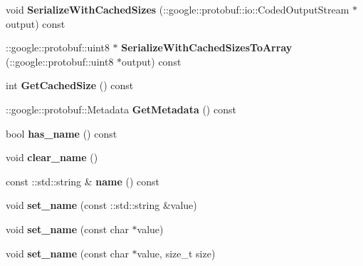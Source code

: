 \begin{DoxyCompactItemize}
void {\bfseries Serialize\+With\+Cached\+Sizes} (\+::google\+::protobuf\+::io\+::\+Coded\+Output\+Stream $\ast$output) const
\item 
\mbox{\label{classcaffe_1_1_v0_layer_parameter_ab7077cfcde5d43e66268f7f5d6acca80}} 
\+::google\+::protobuf\+::uint8 $\ast$ {\bfseries Serialize\+With\+Cached\+Sizes\+To\+Array} (\+::google\+::protobuf\+::uint8 $\ast$output) const
\item 
\mbox{\label{classcaffe_1_1_v0_layer_parameter_a220d565d7507f21e21eb485e328069fa}} 
int {\bfseries Get\+Cached\+Size} () const
\item 
\mbox{\label{classcaffe_1_1_v0_layer_parameter_abc2ca0b7e63ede624170c6f79a2f3fcf}} 
\+::google\+::protobuf\+::\+Metadata {\bfseries Get\+Metadata} () const
\item 
\mbox{\label{classcaffe_1_1_v0_layer_parameter_a41bba43328943403cdda7ea215f3d81a}} 
bool {\bfseries has\+\_\+name} () const
\item 
\mbox{\label{classcaffe_1_1_v0_layer_parameter_af65bd325d158d0ffe37778c2e277a876}} 
void {\bfseries clear\+\_\+name} ()
\item 
\mbox{\label{classcaffe_1_1_v0_layer_parameter_a771661be584825e1b12001ce86d1dc3e}} 
const \+::std\+::string \& {\bfseries name} () const
\item 
\mbox{\label{classcaffe_1_1_v0_layer_parameter_ac941aff7d76c00c845696c104cdc9e83}} 
void {\bfseries set\+\_\+name} (const \+::std\+::string \&value)
\item 
\mbox{\label{classcaffe_1_1_v0_layer_parameter_a4e63a2c894884bee7cb87cab3b674953}} 
void {\bfseries set\+\_\+name} (const char $\ast$value)
\item 
\mbox{\label{classcaffe_1_1_v0_layer_parameter_a3b60d5170617e30f269c7c29eb883827}} 
void {\bfseries set\+\_\+name} (const char $\ast$value, size\+\_\+t size)

\end{DoxyCompactItemize}

